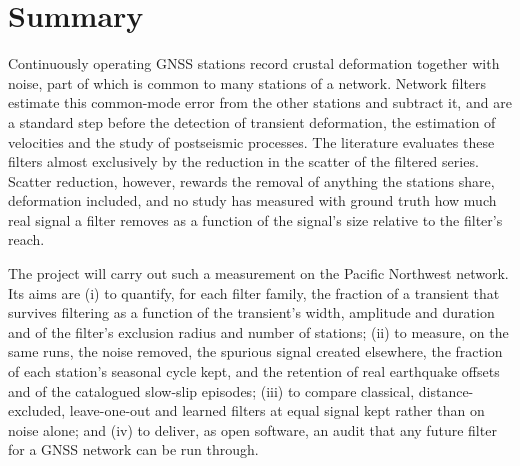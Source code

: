 \documentclass[preprint,12pt,authoryear]{elsarticle}
\begin{document}
\noindent{}

\section{Summary}
\label{sec:summary}

Continuously operating GNSS stations record crustal deformation together with noise, part of which is common to many stations of a network. Network filters estimate this common-mode error from the other stations and subtract it, and are a standard step before the detection of transient deformation, the estimation of velocities and the study of postseismic processes. The literature evaluates these filters almost exclusively by the reduction in the scatter of the filtered series. Scatter reduction, however, rewards the removal of anything the stations share, deformation included, and no study has measured with ground truth how much real signal a filter removes as a function of the signal's size relative to the filter's reach.

The project will carry out such a measurement on the Pacific Northwest network. Its aims are (i) to quantify, for each filter family, the fraction of a transient that survives filtering as a function of the transient's width, amplitude and duration and of the filter's exclusion radius and number of stations; (ii) to measure, on the same runs, the noise removed, the spurious signal created elsewhere, the fraction of each station's seasonal cycle kept, and the retention of real earthquake offsets and of the catalogued slow-slip episodes; (iii) to compare classical, distance-excluded, leave-one-out and learned filters at equal signal kept rather than on noise alone; and (iv) to deliver, as open software, an audit that any future filter for a GNSS network can be run through.
\end{document}
